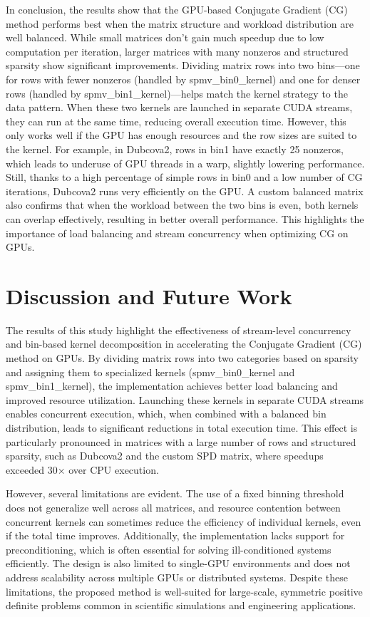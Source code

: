 \documentclass[conference]{IEEEtran}
\begin{document}
In conclusion, the results show that the GPU-based Conjugate Gradient (CG) method performs best when the matrix structure and workload distribution are well balanced. While small matrices don’t gain much speedup due to low computation per iteration, larger matrices with many nonzeros and structured sparsity show significant improvements. Dividing matrix rows into two bins—one for rows with fewer nonzeros (handled by spmv\_bin0\_kernel) and one for denser rows (handled by spmv\_bin1\_kernel)—helps match the kernel strategy to the data pattern. When these two kernels are launched in separate CUDA streams, they can run at the same time, reducing overall execution time. However, this only works well if the GPU has enough resources and the row sizes are suited to the kernel. For example, in Dubcova2, rows in bin1 have exactly 25 nonzeros, which leads to underuse of GPU threads in a warp, slightly lowering performance. Still, thanks to a high percentage of simple rows in bin0 and a low number of CG iterations, Dubcova2 runs very efficiently on the GPU. A custom balanced matrix also confirms that when the workload between the two bins is even, both kernels can overlap effectively, resulting in better overall performance. This highlights the importance of load balancing and stream concurrency when optimizing CG on GPUs.


\section{Discussion and Future Work}
The results of this study highlight the effectiveness of stream-level concurrency and bin-based kernel decomposition in accelerating the Conjugate Gradient (CG) method on GPUs. By dividing matrix rows into two categories based on sparsity and assigning them to specialized kernels (spmv\_bin0\_kernel and spmv\_bin1\_kernel), the implementation achieves better load balancing and improved resource utilization. Launching these kernels in separate CUDA streams enables concurrent execution, which, when combined with a balanced bin distribution, leads to significant reductions in total execution time. This effect is particularly pronounced in matrices with a large number of rows and structured sparsity, such as Dubcova2 and the custom SPD matrix, where speedups exceeded 30× over CPU execution. 

However, several limitations are evident. The use of a fixed binning threshold does not generalize well across all matrices, and resource contention between concurrent kernels can sometimes reduce the efficiency of individual kernels, even if the total time improves. Additionally, the implementation lacks support for preconditioning, which is often essential for solving ill-conditioned systems efficiently. The design is also limited to single-GPU environments and does not address scalability across multiple GPUs or distributed systems. Despite these limitations, the proposed method is well-suited for large-scale, symmetric positive definite problems common in scientific simulations and engineering applications. 
\end{document}

